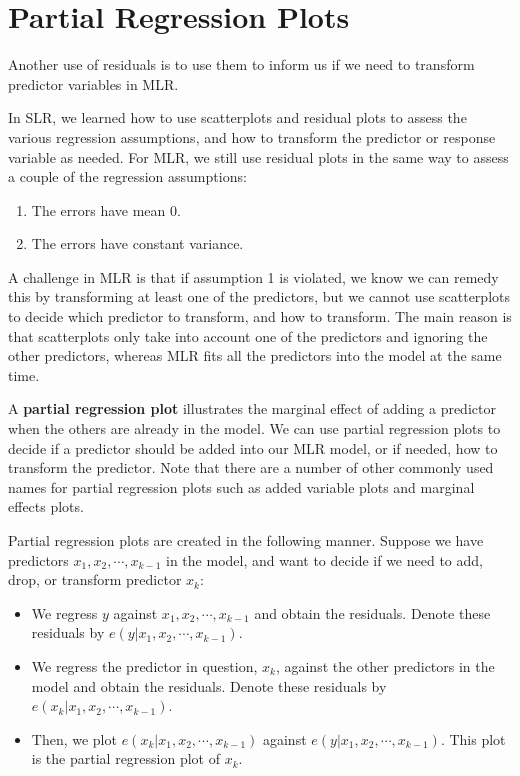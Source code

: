 \documentclass[
]{book}
\providecommand{\tightlist}{%
  \setlength{\itemsep}{0pt}\setlength{\parskip}{0pt}}
\begin{document}
\hypertarget{partial-regression-plots}{%
\section{Partial Regression Plots}\label{partial-regression-plots}}

Another use of residuals is to use them to inform us if we need to transform predictor variables in MLR.

In SLR, we learned how to use scatterplots and residual plots to assess the various regression assumptions, and how to transform the predictor or response variable as needed. For MLR, we still use residual plots in the same way to assess a couple of the regression assumptions:

\begin{enumerate}
\def\labelenumi{\arabic{enumi}.}
\tightlist
\item
  The errors have mean 0.
\item
  The errors have constant variance.
\end{enumerate}

A challenge in MLR is that if assumption 1 is violated, we know we can remedy this by transforming at least one of the predictors, but we cannot use scatterplots to decide which predictor to transform, and how to transform. The main reason is that scatterplots only take into account one of the predictors and ignoring the other predictors, whereas MLR fits all the predictors into the model at the same time.

A \textbf{partial regression plot} illustrates the marginal effect of adding a predictor when the others are already in the model. We can use partial regression plots to decide if a predictor should be added into our MLR model, or if needed, how to transform the predictor. Note that there are a number of other commonly used names for partial regression plots such as added variable plots and marginal effects plots.

Partial regression plots are created in the following manner. Suppose we have predictors \(x_1, x_2, \cdots, x_{k-1}\) in the model, and want to decide if we need to add, drop, or transform predictor \(x_k\):

\begin{itemize}
\tightlist
\item
  We regress \(y\) against \(x_1, x_2, \cdots, x_{k-1}\) and obtain the residuals. Denote these residuals by \(e(y|x_1, x_2, \cdots, x_{k-1})\).
\item
  We regress the predictor in question, \(x_k\), against the other predictors in the model and obtain the residuals. Denote these residuals by \(e(x_k|x_1, x_2, \cdots, x_{k-1})\).
\item
  Then, we plot \(e(x_k|x_1, x_2, \cdots, x_{k-1})\) against \(e(y|x_1, x_2, \cdots, x_{k-1})\). This plot is the partial regression plot of \(x_k\).
\end{itemize}
\end{document}
